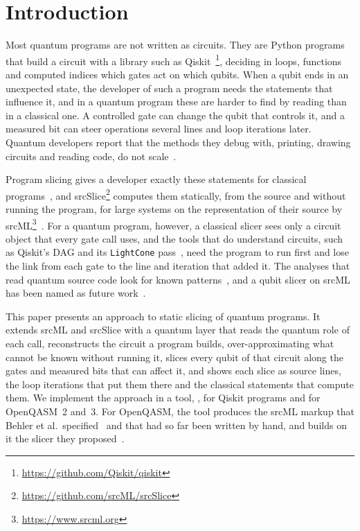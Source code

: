 \section{Introduction}\label{sec:b-intro}

Most quantum programs are not written as circuits. They are Python programs that build a circuit with a library such
as Qiskit~\cite{javadi2024qiskit}\footnote{\url{https://github.com/Qiskit/qiskit}}, deciding in loops, functions and computed indices which gates act on which qubits.
When a qubit ends in an unexpected state, the developer of such a program needs the statements that influence it, and
in a quantum program these are harder to find by reading than in a classical one. A controlled gate can change the
qubit that controls it, and a measured bit can steer operations several lines and loop iterations later. Quantum
developers report that the methods they debug with, printing, drawing circuits and reading code, do not
scale~\cite{zappin2026challenges}.

Program slicing gives a developer exactly these statements for classical programs~\cite{weiser1984program}, and
srcSlice\footnote{\url{https://github.com/srcML/srcSlice}} computes them statically, from the source and without running the program, %
for large systems on the representation of their source by srcML\footnote{\url{https://www.srcml.org}}~\cite{alomari2014srcslice,
collard2013srcml}. For a
quantum program, however, a classical slicer sees only a circuit object that every gate call uses, and the tools
that do understand circuits, such as Qiskit's DAG and its \texttt{LightCone} pass~\cite{qiskit2025}, need the program to
run first and lose the link from each gate to the line and iteration that added it. The analyses that read quantum
source code look for known patterns~\cite{paltenghi2024lintq, zhao2023qchecker}, and a qubit slicer on srcML has been
named as future work~\cite{behler2025static}.

This paper presents an approach to static slicing of quantum programs. It extends srcML and srcSlice with a quantum
layer that reads the quantum role of each call, reconstructs the circuit a program builds, over-approximating what
cannot be known without running it, slices every qubit of that circuit along the gates and measured bits that can
affect it, and shows each slice as source lines, the loop iterations that put them there and the classical statements
that compute them. We implement the approach in a tool, \tool{}, for Qiskit programs and for OpenQASM~2 and~3. For
OpenQASM, the tool produces the srcML markup that Behler et al.\ specified~\cite{behler2024supporting} and that had so
far been written by hand, and builds on it the slicer they proposed~\cite{behler2025static}.

